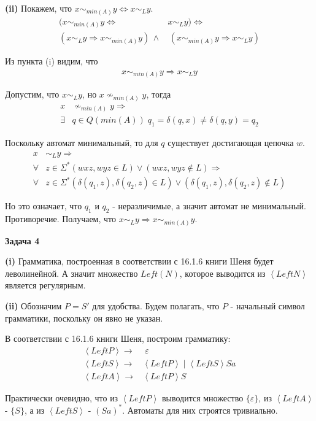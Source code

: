 \documentclass[10pt]{article}
\let \eps \varepsilon
\begin{document}
\smallskip

{\bf (ii)}
Покажем, что $x \sim_{min(A)} y \Leftrightarrow x \sim_L y$.
\begin{align*}
  (x \sim_{min(A)} y \Leftrightarrow& x \sim_L y) \Leftrightarrow \\
  (x \sim_L y \Rightarrow x \sim_{min(A)} y) \, \wedge& \, (x \sim_{min(A)} y \Rightarrow x \sim_L y)
\end{align*}

Из пункта (i) видим, что
\begin{align*}
  x \sim_{min(A)} y \Rightarrow x \sim_L y
\end{align*}

Допустим, что $x \sim_L y$, но $x \nsim_{min(A)} y$, тогда
\begin{align*}
  x& \nsim_{min(A)} y \Rightarrow \\
  \exists& q \in Q(min(A)) \; q_1 = \delta(q, x) \neq \delta(q, y) = q_2
\end{align*}

Поскольку автомат минимальный, то для $q$ существует достигающая цепочка $w$.
\begin{align*}
  x& \sim_L y \Rightarrow \\
  \forall& z \in \Sigma^* (wxz, wyz \in L) \vee (wxz, wyz \notin L) \Rightarrow \\
  \forall& z \in \Sigma^* (\delta(q_1, z), \delta(q_2, z) \in L) \vee (\delta(q_1, z), \delta(q_2, z) \notin L)
\end{align*}

Но это означает, что $q_1$ и $q_2$ - неразличимые, а значит автомат не минимальный.
Противоречие.
Получаем, что $x \sim_L y \Rightarrow x \sim_{min(A)} y$.

\medskip

{\bf Задача 4}

{\bf (i)}
Грамматика, построенная в соответствии с 16.1.6 книги Шеня будет леволинейной.
А значит множество $Left(N)$, которое выводится из $\left\langle LeftN \right\rangle$ является регулярным.

\smallskip

{\bf (ii)}
Обозначим $P = S'$ для удобства. Будем полагать, что $P$ - начальный символ грамматики, поскольку он явно не указан.

В соответствии с 16.1.6 книги Шеня, построим грамматику:
\begin{align*}
  \left\langle LeftP \right\rangle \rightarrow& \; \eps \\
  \left\langle LeftS \right\rangle \rightarrow& \left\langle LeftP \right\rangle \; | \; \left\langle LeftS \right\rangle S a \\
  \left\langle LeftA \right\rangle \rightarrow& \left\langle LeftP \right\rangle S
\end{align*}

Практически очевидно, что из $\left\langle LeftP \right\rangle$ выводится множество $\{ \eps \}$, из $\left\langle LeftA \right\rangle$ - $\{ S \}$, а из $\left\langle LeftS \right\rangle$ - $(Sa)^*$. Автоматы для них строятся тривиально.
\end{document}
